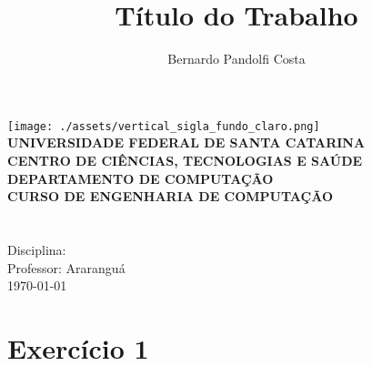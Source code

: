 \documentclass[a4paper,12pt]{article}
\author{Bernardo Pandolfi Costa}
\title{Título do Trabalho}
\begin{document}
\makeatletter
\begin{titlepage}
    \begin{center}
    \texttt{[image: ./assets/vertical\_sigla\_fundo\_claro.png]}\\
        \small
        \vspace{0.25cm}
        \textbf{UNIVERSIDADE FEDERAL DE SANTA CATARINA}\\
		\textbf{CENTRO DE CIÊNCIAS, TECNOLOGIAS E SAÚDE}\\
		\textbf{DEPARTAMENTO DE COMPUTAÇÃO}\\
		\textbf{CURSO DE ENGENHARIA DE COMPUTAÇÃO}\\
        \vspace{7cm}
        \Large
        \textbf{\@title}\\
        \vspace{0.5cm}
        \normalsize
        \textbf{\@author}\\
        \vspace{1.5cm}
        \small
        Disciplina:\\
        Professor:
        \vfill
        Araranguá\\
        \today
    \end{center}
\end{titlepage}
\makeatother

\tableofcontents
\newpage

\section{Exercício 1}
\end{document}
